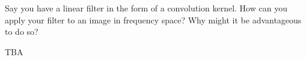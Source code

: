 \begin{blocksection}
\question Say you have a linear filter in the form of a convolution kernel. How can you apply your filter to an image in frequency space? Why might it be advantageous to do so?

\begin{solution}[0.75in]
{\color{red} TBA}
\end{solution}
\end{blocksection}
